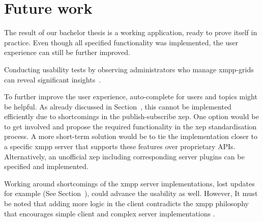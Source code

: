 




\section{Future work}
The result of our bachelor thesis is a working application, ready to prove itself in practice.
Even though all specified functionality was implemented, the user experience can still be further improved.

Conducting usability tests by observing administrators who manage \glspl{xmpp-grid} can reveal significant insights~\cite{krug:dont-make-me-think}.

To further improve the user experience, auto-complete for users and topics might be helpful.
As already discussed in Section~, this cannot be implemented efficiently due to shortcomings in the \gls{publish-subscribe} \gls{xep}.
One option would be to get involved and propose the required functionality in the \gls{xep} standardisation process.
A more short-term solution would be to tie the implementation closer to a specific \gls{xmpp} server that supports these features over proprietary APIs.
Alternatively, an unofficial \gls{xep} including corresponding server plugins can be specified and implemented.

Working around shortcomings of the \gls{xmpp} server implementations, lost updates for example (See Section~), could advance the usability as well.
However, It must be noted that adding more logic in the client contradicts the \gls{xmpp} philosophy that encourages simple client and complex server implementations \cite{definitive-guide-xmpp}.

